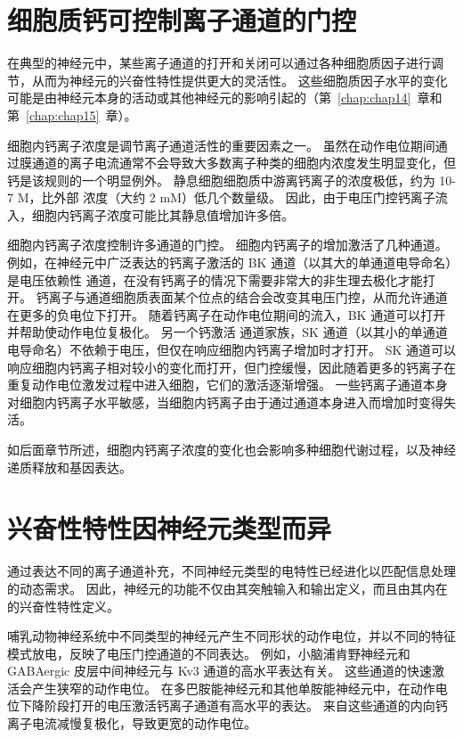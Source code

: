 \section{细胞质钙可控制离子通道的门控}

在典型的神经元中，某些离子通道的打开和关闭可以通过各种细胞质因子进行调节，从而为神经元的兴奋性特性提供更大的灵活性。
这些细胞质因子水平的变化可能是由神经元本身的活动或其他神经元的影响引起的（第~\ref{chap:chap14}~章和第~\ref{chap:chap15}~章）。


细胞内钙离子浓度是调节离子通道活性的重要因素之一。
虽然在动作电位期间通过膜通道的离子电流通常不会导致大多数离子种类的细胞内浓度发生明显变化，但钙是该规则的一个明显例外。
静息细胞细胞质中游离钙离子的浓度极低，约为 10-7 M，比外部  浓度（大约 2 mM）低几个数量级。 
因此，由于电压门控钙离子流入，细胞内钙离子浓度可能比其静息值增加许多倍。


细胞内钙离子浓度控制许多通道的门控。
细胞内钙离子的增加激活了几种通道。
例如，在神经元中广泛表达的钙离子激活的 BK 通道（以其大的单通道电导命名）是电压依赖性  通道，在没有钙离子的情况下需要非常大的非生理去极化才能打开。
钙离子与通道细胞质表面某个位点的结合会改变其电压门控，从而允许通道在更多的负电位下打开。
随着钙离子在动作电位期间的流入，BK 通道可以打开并帮助使动作电位复极化。
另一个钙激活  通道家族，SK 通道（以其小的单通道电导命名）不依赖于电压，但仅在响应细胞内钙离子增加时才打开。
SK 通道可以响应细胞内钙离子相对较小的变化而打开，但门控缓慢，因此随着更多的钙离子在重复动作电位激发过程中进入细胞，它们的激活逐渐增强。
一些钙离子通道本身对细胞内钙离子水平敏感，当细胞内钙离子由于通过通道本身进入而增加时变得失活。


如后面章节所述，细胞内钙离子浓度的变化也会影响多种细胞代谢过程，以及神经递质释放和基因表达。



\section{兴奋性特性因神经元类型而异}

通过表达不同的离子通道补充，不同神经元类型的电特性已经进化以匹配信息处理的动态需求。
因此，神经元的功能不仅由其突触输入和输出定义，而且由其内在的兴奋性特性定义。


哺乳动物神经系统中不同类型的神经元产生不同形状的动作电位，并以不同的特征模式放电，反映了电压门控通道的不同表达。
例如，小脑浦肯野神经元和 GABAergic 皮层中间神经元与 Kv3 通道的高水平表达有关。
这些通道的快速激活会产生狭窄的动作电位。
在多巴胺能神经元和其他单胺能神经元中，在动作电位下降阶段打开的电压激活钙离子通道有高水平的表达。
来自这些通道的内向钙离子电流减慢复极化，导致更宽的动作电位。


